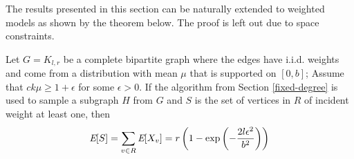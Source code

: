 The results presented in this section can be naturally extended to weighted models as shown by the theorem below. The proof is left out due to space constraints.

\begin{thm}
\label{wtd-thm}
Let $G=K_{l,r}$ be a complete bipartite graph where the edges have i.i.d. weights and come from a distribution with mean $\mu$ that is supported on $[0,b]$; Assume that $ck\mu \geq 1+\epsilon$ for some $\epsilon > 0$. If the algorithm from Section \ref{fixed-degree} is used to sample a subgraph $H$ from $G$ and $S$ is the set of vertices in $R$ of incident weight at least one, then
\[ \emph{\text{E}}[S] = \sum_{v\in R} \emph{\text{E}}[X_v] = r\left(1-\exp\left(-\frac{2l\epsilon^2}{b^2}\right)\right) \]
\end{thm}
